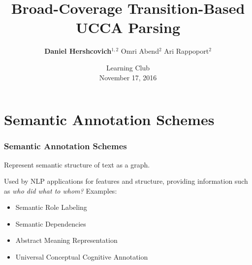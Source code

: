 \documentclass[t]{beamer}
\begin{document}
\title{Broad-Coverage Transition-Based UCCA Parsing}
\author[Daniel Hershcovich]{\textbf{Daniel Hershcovich}$^{1,2}$ \And Omri Abend$^2$ \And Ari Rappoport$^2$
}
\date{Learning Club \\ November 17, 2016}

\begin{frame}
\titlepage

\end{frame}



\section{Semantic Annotation Schemes}

\begin{frame}
\frametitle{Semantic Annotation Schemes}
Represent semantic structure of text as a graph.

Used by NLP applications for features and structure,
providing information such as \textit{who did what to whom?}
\vfill
Examples:
\begin{itemize}
 \item Semantic Role Labeling
 \item Semantic Dependencies
 \item Abstract Meaning Representation
 \item Universal Conceptual Cognitive Annotation
\end{itemize}
\end{frame}
\end{document}
